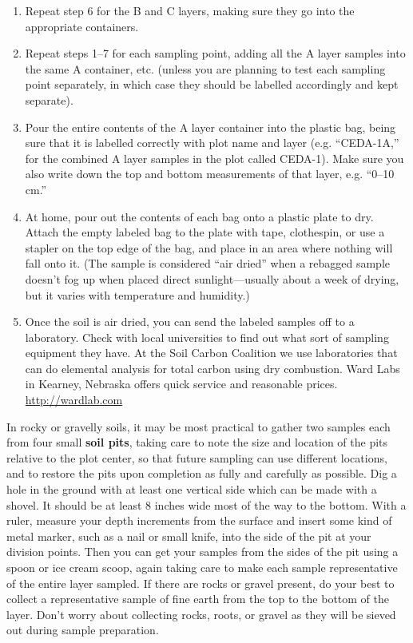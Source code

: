 \documentclass[11pt,letterpaper,twoside,onecolumn]{memoir}
\begin{document}
\begin{enumerate}
\item Repeat step 6 for the B and C layers, making sure they go into the appropriate containers.

\item Repeat steps 1--7 for each sampling point, adding all the A layer samples into the same A container, etc. (unless you are planning to test each sampling point separately, in which case they should be labelled accordingly and kept separate).

\item Pour the entire contents of the A layer container into the plastic bag, being sure that it is labelled correctly with plot name and layer (e.g. ``CEDA-1A,'' for the combined A layer samples in the plot called CEDA-1). Make sure you also write down the top and bottom measurements of that layer, e.g. ``0--10 cm.''

\item At home, pour out the contents of each bag onto a plastic plate to dry. Attach the empty labeled bag to the plate with tape, clothespin, or use a stapler on the top edge of the bag, and place in an area where nothing will fall onto it. (The sample is considered ``air dried'' when a rebagged sample doesn't fog up when placed direct sunlight---usually about a week of drying, but it varies with temperature and humidity.) 

\item Once the soil is air dried, you can send the labeled samples off to a laboratory. Check with local universities to find out what sort of sampling equipment they have. At the Soil Carbon Coalition we use laboratories that can do elemental analysis for total carbon using dry combustion. Ward Labs in Kearney, Nebraska offers quick service and reasonable prices. \url{http://wardlab.com}

\end{enumerate}

In rocky or gravelly soils, it may be most practical to gather two samples each from four small \textbf{soil pits}, taking care to note the size and location of the pits relative to the plot center, so that future sampling can use different locations, and to restore the pits upon completion as fully and carefully as possible. Dig a hole in the ground with at least one vertical side which can be made with a shovel. It should be at least 8 inches wide most of the way to the bottom. With a ruler, measure your depth increments from the surface and insert some kind of metal marker, such as a nail or small knife, into the side of the pit at your division points. Then you can get your samples from the sides of the pit using a spoon or ice cream scoop, again taking care to make each sample representative of the entire layer sampled. If there are rocks or gravel present, do your best to collect a representative sample of fine earth from the top to the bottom of the layer. Don't worry about collecting rocks, roots, or gravel as they will be sieved out during sample preparation.
\end{document}
